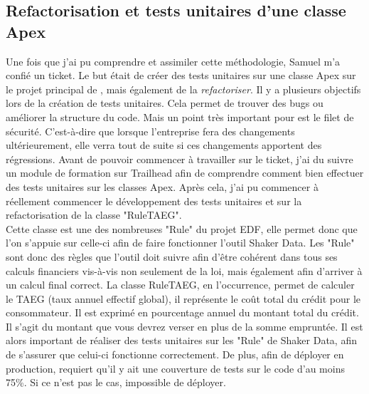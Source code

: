 \documentclass[12pt,oneside,noprintercorrection]{iut}
\begin{document}
 \subsection{Refactorisation et tests unitaires d'une classe Apex}
 Une fois que j'ai pu comprendre et assimiler cette méthodologie, Samuel m'a confié un ticket. Le but était de créer des tests unitaires sur une classe Apex sur le projet principal de \gz{}, mais également de la \textit{refactoriser}. Il y a plusieurs objectifs lors de la création de tests unitaires. Cela permet de trouver des bugs ou améliorer la structure du code. Mais un point très important pour \gz{} est le filet de sécurité. C'est-à-dire que lorsque l'entreprise fera des changements ultérieurement, elle verra tout de suite si ces changements apportent des régressions.
 Avant de pouvoir commencer à travailler sur le ticket, j'ai du suivre un module de formation sur Trailhead afin de comprendre comment bien effectuer des tests unitaires sur les classes Apex. Après cela, j'ai pu commencer à réellement commencer le développement des tests unitaires et sur la refactorisation de la classe "RuleTAEG". 
 ~\\\indent Cette classe est une des nombreuses "Rule" du projet EDF, elle permet donc que l'on s'appuie sur celle-ci afin de faire fonctionner l'outil Shaker Data. Les "Rule" sont donc des règles que l'outil doit suivre afin d'être cohérent dans tous ses calculs financiers vis-à-vis non seulement de la loi, mais également afin d'arriver à un calcul final correct. La classe RuleTAEG, en l'occurrence, permet de calculer le TAEG (taux annuel effectif global), il représente le coût total du crédit pour le consommateur. Il est exprimé en pourcentage annuel du montant total du crédit. Il s’agit du montant que vous devrez verser en plus de la somme empruntée. Il est alors important de réaliser des tests unitaires sur les "Rule" de Shaker Data, afin de s'assurer que celui-ci fonctionne correctement. De plus, afin de déployer en production, \slf{} requiert qu'il y ait une couverture de tests sur le code d'au moins 75\%. Si ce n'est pas le cas, impossible de déployer. 
\end{document}
